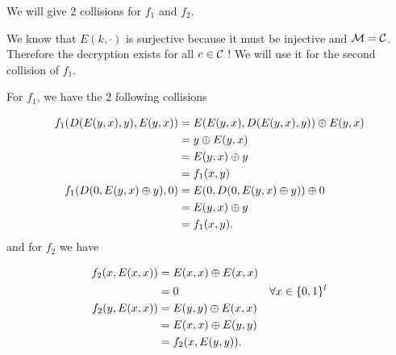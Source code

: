 \begin{solution}
  We will give 2 collisions for $f_1$ and $f_2$.

  We know that $E(k, \cdot)$ is surjective because it must be injective and $\mathcal{M} = \mathcal{C}$.
  Therefore the decryption exists for all $c \in \mathcal{C}$ ! We will use it for the second collision of $f_1$.

  For $f_1$, we have the 2 following collisions

  \begin{align*}
    f_1(D(E(y,x),y), E(y,x))
    & = E(E(y,x), D(E(y,x), y)) \oplus E(y,x)\\
    & = y \oplus E(y,x)\\
    & = E(y,x) \oplus y\\
    & = f_1(x, y)\\
    f_1(D(0, E(y,x) \oplus y), 0)
    & = E(0, D(0, E(y, x) \oplus y)) \oplus 0\\
    & = E(y, x) \oplus y\\
    & = f_1(x, y).
  \end{align*}
  and for $f_2$ we have

  \begin{align*}
    f_2(x, E(x,x)) & = E(x,x) \oplus E(x,x)\\
                   & = 0 & \forall x \in \{0,1\}^l\\
    f_2(y, E(x,x)) & = E(y,y) \oplus E(x,x)\\
                   & = E(x,x) \oplus E(y,y)\\
                   & = f_2(x, E(y,y)).
  \end{align*}
\end{solution}

